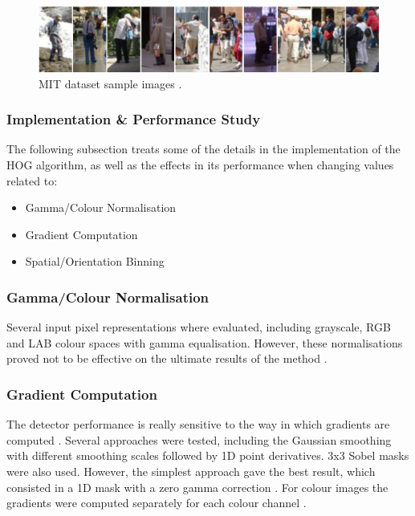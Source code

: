 \begin{figure}[!htbp]
  \begin{center}
  \includegraphics[width=\linewidth]{images/chapter6_mit_database.png}
  \end{center}
  \caption{MIT dataset sample images \cite{paper:dalal2005histograms}.}
  \label{fig:mit_dataset}
\end{figure}

\subsubsection{Implementation \& Performance Study}

The following subsection treats some of the details in the implementation of the HOG algorithm, as well as the effects in its performance when changing values related to:

\begin{itemize}
	\item Gamma/Colour Normalisation
	\item Gradient Computation
    \item Spatial/Orientation Binning
\end{itemize}

\subsubsection{Gamma/Colour Normalisation}

Several input pixel representations where evaluated, including grayscale, RGB and LAB colour spaces with gamma equalisation. However, these normalisations proved not to be effective on the ultimate results of the method \cite{paper:dalal2005histograms}.

\subsubsection{Gradient Computation}

The detector performance is really sensitive to the way in which gradients are computed \cite{paper:dalal2005histograms}. Several approaches were tested, including the Gaussian smoothing with different smoothing scales followed by 1D point derivatives. 3x3 Sobel masks were also used. However, the simplest approach gave the best result, which consisted in a 1D mask with a zero gamma correction \cite{paper:dalal2005histograms}. For colour images the gradients were computed separately for each colour channel \cite{paper:dalal2005histograms}.

